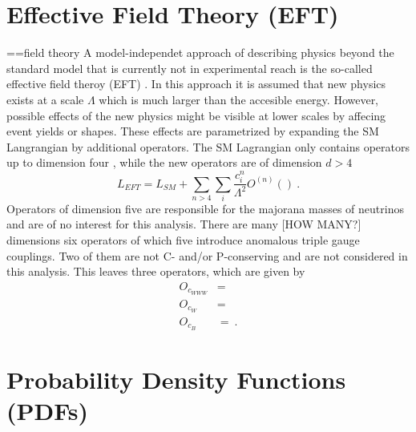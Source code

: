 \section{Effective Field Theory (EFT)}
==field theory
A model-independet approach of describing physics beyond the standard model that is currently not in experimental reach is the so-called effective field theroy (EFT) \cite{EFT}. In this approach it is assumed that new physics exists at a scale $\Lambda$ which is much larger than the accesible energy. However, possible effects of the new physics might be visible at lower scales by affecing event yields or shapes. These effects are parametrized by expanding the SM Langrangian by additional operators. The SM Lagrangian only contains operators up to dimension four \cite{}, while the new operators are of dimension $d>4$
\begin{equation}
L_{EFT} = L_{SM} + \sum_{n>4} \sum_i \frac{c_i^n}{\Lambda^2}O^{(n)}() ~.
\end{equation}
Operators of dimension five are responsible for the majorana masses of neutrinos \cite{nu_majo} and are of no interest for this analysis. There are many [HOW MANY?] dimensions six operators of which five introduce anomalous triple gauge couplings. Two of them are not C- and/or P-conserving and are not considered in this analysis. This leaves three operators, which are given by
\begin{align}
O_{c_{WWW}} &= \\
O_{c_W} &= \\
O_{c_B} &= ~.
\end{align}
\section{Probability Density Functions (PDFs)}